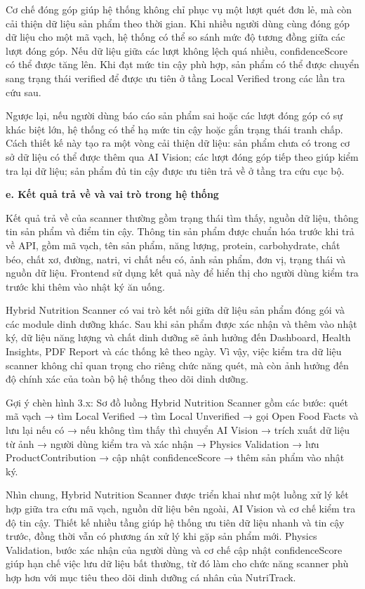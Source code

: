 Cơ chế đóng góp giúp hệ thống không chỉ phục vụ một lượt quét đơn lẻ, mà còn cải thiện dữ liệu sản phẩm theo thời gian. Khi nhiều người dùng cùng đóng góp dữ liệu cho một mã vạch, hệ thống có thể so sánh mức độ tương đồng giữa các lượt đóng góp. Nếu dữ liệu giữa các lượt không lệch quá nhiều, confidenceScore có thể được tăng lên. Khi đạt mức tin cậy phù hợp, sản phẩm có thể được chuyển sang trạng thái verified để được ưu tiên ở tầng Local Verified trong các lần tra cứu sau.

Ngược lại, nếu người dùng báo cáo sản phẩm sai hoặc các lượt đóng góp có sự khác biệt lớn, hệ thống có thể hạ mức tin cậy hoặc gắn trạng thái tranh chấp. Cách thiết kế này tạo ra một vòng cải thiện dữ liệu: sản phẩm chưa có trong cơ sở dữ liệu có thể được thêm qua AI Vision; các lượt đóng góp tiếp theo giúp kiểm tra lại dữ liệu; sản phẩm đủ tin cậy được ưu tiên trả về ở tầng tra cứu cục bộ.

\textbf{e. Kết quả trả về và vai trò trong hệ thống}

Kết quả trả về của scanner thường gồm trạng thái tìm thấy, nguồn dữ liệu, thông tin sản phẩm và điểm tin cậy. Thông tin sản phẩm được chuẩn hóa trước khi trả về API, gồm mã vạch, tên sản phẩm, năng lượng, protein, carbohydrate, chất béo, chất xơ, đường, natri, vi chất nếu có, ảnh sản phẩm, đơn vị, trạng thái và nguồn dữ liệu. Frontend sử dụng kết quả này để hiển thị cho người dùng kiểm tra trước khi thêm vào nhật ký ăn uống.

Hybrid Nutrition Scanner có vai trò kết nối giữa dữ liệu sản phẩm đóng gói và các module dinh dưỡng khác. Sau khi sản phẩm được xác nhận và thêm vào nhật ký, dữ liệu năng lượng và chất dinh dưỡng sẽ ảnh hưởng đến Dashboard, Health Insights, PDF Report và các thống kê theo ngày. Vì vậy, việc kiểm tra dữ liệu scanner không chỉ quan trọng cho riêng chức năng quét, mà còn ảnh hưởng đến độ chính xác của toàn bộ hệ thống theo dõi dinh dưỡng.

Gợi ý chèn hình 3.x: Sơ đồ luồng Hybrid Nutrition Scanner gồm các bước: quét mã vạch → tìm Local Verified → tìm Local Unverified → gọi Open Food Facts và lưu lại nếu có → nếu không tìm thấy thì chuyển AI Vision → trích xuất dữ liệu từ ảnh → người dùng kiểm tra và xác nhận → Physics Validation → lưu ProductContribution → cập nhật confidenceScore → thêm sản phẩm vào nhật ký.

Nhìn chung, Hybrid Nutrition Scanner được triển khai như một luồng xử lý kết hợp giữa tra cứu mã vạch, nguồn dữ liệu bên ngoài, AI Vision và cơ chế kiểm tra độ tin cậy. Thiết kế nhiều tầng giúp hệ thống ưu tiên dữ liệu nhanh và tin cậy trước, đồng thời vẫn có phương án xử lý khi gặp sản phẩm mới. Physics Validation, bước xác nhận của người dùng và cơ chế cập nhật confidenceScore giúp hạn chế việc lưu dữ liệu bất thường, từ đó làm cho chức năng scanner phù hợp hơn với mục tiêu theo dõi dinh dưỡng cá nhân của NutriTrack.

